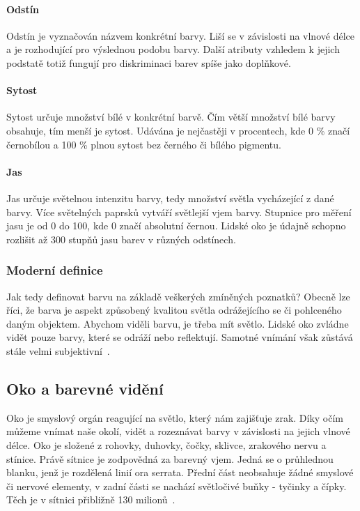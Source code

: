 \paragraph{Odstín}
Odstín je vyznačován názvem konkrétní barvy. Liší se v závislosti na vlnové délce a je rozhodující pro výslednou podobu barvy. Další atributy vzhledem k jejich
podstatě totiž fungují pro diskriminaci barev spíše jako doplňkové.

\paragraph{Sytost}
Sytost určuje množství bílé v konkrétní barvě. Čím větší množství bílé barvy obsahuje, tím menší je sytost. Udávána je nejčastěji v procentech, kde 0 \% značí černobílou a 100 \% 
plnou sytost bez černého či bílého pigmentu.

\paragraph{Jas}
Jas určuje světelnou intenzitu barvy, tedy množství světla vycházející z dané barvy. Více světelných paprsků vytváří světlejší vjem barvy. Stupnice pro měření jasu je od 0 do 100, kde 0
značí absolutní černou. Lidské oko je údajně schopno rozlišit až 300 stupňů jasu barev v různých odstínech.


\subsubsection{Moderní definice}
Jak tedy definovat barvu na základě veškerých zmíněných poznatků? Obecně lze říci, že barva je aspekt způsobený kvalitou světla odrážejícího se či pohlceného daným objektem.
Abychom viděli barvu, je třeba mít světlo. Lidské oko zvládne vidět pouze barvy, které se odráží nebo reflektují. Samotné vnímání však zůstává stále velmi subjektivní~\cite{pantone}.

\subsection{Oko a barevné vidění}
Oko je smyslový orgán reagující na světlo, který nám zajišťuje zrak. Díky očím můžeme vnímat naše okolí, vidět a rozeznávat barvy
v závislosti na jejich vlnové délce. Oko je složené z rohovky, duhovky, čočky, sklivce, zrakového nervu a stínice.
Právě sítnice je zodpovědná za barevný vjem. Jedná se o průhlednou blanku, jenž je rozdělená linií ora serrata. Přední část
neobsahuje žádné smyslové či nervové elementy, v zadní části se nachází světločivé buňky - tyčinky a čípky. Těch je v sítnici
přibližně 130 milionů~\cite{hanulikova2013}.

